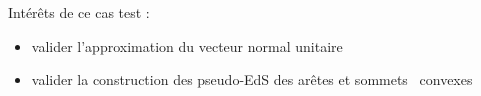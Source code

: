 Intérêts de ce cas test :
\begin{itemize}
	\item valider l'approximation du vecteur normal unitaire 
	\item valider la construction des pseudo-EdS des arêtes et sommets \brep\ convexes
\end{itemize}